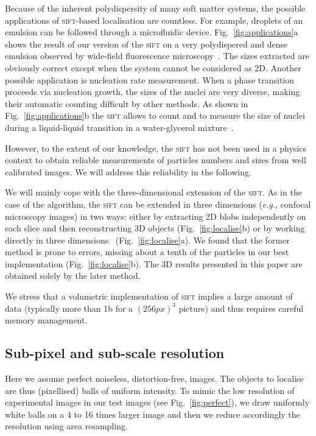 \documentclass[8.5pt,twoside,twocolumn]{article}
\begin{document}
Because of the inherent polydispersity of many soft matter systems, the possible applications of \textsc{sift}-based localisation are countless. For example, droplets of an emulsion can be followed through a microfluidic device. Fig.~\ref{fig:applications}a shows the result of our version of the \textsc{sift} on a very polydispered and dense emulsion observed by wide-field fluorescence microscopy~\cite{Montagne2011}. The sizes extracted are obviously correct except when the system cannot be considered as 2D. Another possible application is nucleation rate measurement. When a phase transition proceeds via nucleation growth, the sizes of the nuclei are very diverse, making their automatic counting difficult by other methods. As shown in Fig.~\ref{fig:applications}b the \textsc{sift} allows to count and to measure the size of nuclei during a liquid-liquid transition in a water-glycerol mixture~\cite{Murata2012}.

However, to the extent of our knowledge, the \textsc{sift} has not been used in a physics context to obtain reliable measurements of particles numbers and sizes from well calibrated images. We will address this reliability in the following.

We will mainly cope with the three-dimensional extension of the \textsc{sift}. As in the case of the \citet{Crocker1996} algorithm, the \textsc{sift} can be extended in three dimensions (\emph{e.g.}, confocal microscopy images) in two ways: either by extracting 2D blobs independently on each slice and then reconstructing 3D objects (Fig.~\ref{fig:localise}b) or by working directly in three dimensions~\cite{Urschler2006, Cheung2009} (Fig.~\ref{fig:localise}a). We found that the former method is prone to errors, missing about a tenth of the particles in our best implementation (Fig.~\ref{fig:localise}b). The 3D results presented in this paper are obtained solely by the later method.

We stress that a volumetric implementation of \textsc{sift} implies a large amount of data (typically more than \unit{1}{\giga b} for a $(\unit{256}{px})^3$ picture) and thus requires careful memory management.

\subsection{Sub-pixel and sub-scale resolution}

Here we assume perfect noiseless, distortion-free, images. The objects to localise are thus (pixellised) balls of uniform intensity. To mimic the low resolution of experimental images in our test images (see Fig.~\ref{fig:perfect}), we draw uniformly white balls on a 4 to 16 times larger image and then we reduce accordingly the resolution using area resampling.
\end{document}
